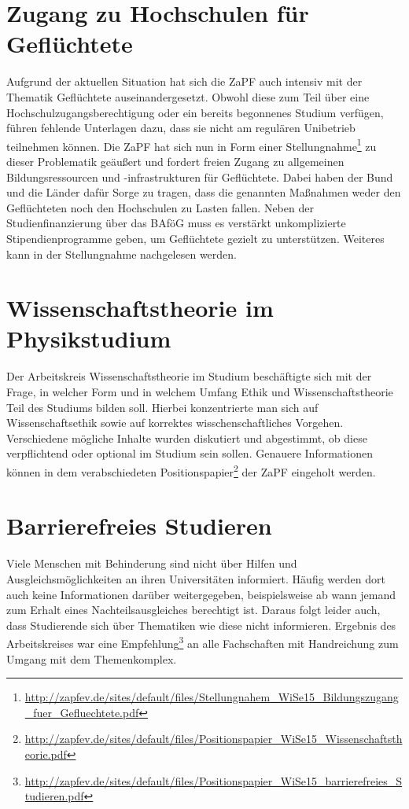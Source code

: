 \section*{Zugang zu Hochschulen für Geflüchtete}
Aufgrund der aktuellen Situation hat sich die ZaPF auch intensiv mit der
Thematik \glqq{}Geflüchtete\grqq{} auseinandergesetzt. Obwohl diese zum Teil
über eine Hochschulzugangsberechtigung oder ein bereits begonnenes Studium
verfügen, führen fehlende Unterlagen dazu, dass sie nicht am regulären
Unibetrieb teilnehmen können. Die ZaPF hat sich nun in Form einer
Stellungnahme\footnote{\href{http://zapfev.de/sites/default/files/Stellungnahem\_WiSe15\_Bildungszugang\_fuer\_Gefluechtete.pdf}{\url{http://zapfev.de/sites/default/files/Stellungnahem\_WiSe15\_Bildungszugang\_fuer\_Gefluechtete.pdf}}}
zu dieser Problematik geäußert und fordert freien Zugang zu allgemeinen
Bildungsressourcen und -infrastrukturen für Geflüchtete. Dabei haben der Bund
und die Länder dafür Sorge zu tragen, dass die genannten Maßnahmen weder den
Geflüchteten noch den Hochschulen zu Lasten fallen. Neben der
Studienfinanzierung über das BAföG muss es verstärkt unkomplizierte
Stipendienprogramme geben, um Geflüchtete gezielt zu unterstützen. Weiteres kann
in der Stellungnahme nachgelesen werden.

\section*{Wissenschaftstheorie im Physikstudium}
Der  Arbeitskreis \glqq{}Wissenschaftstheorie im Studium\grqq{} beschäftigte
sich mit der Frage, in welcher Form und in welchem Umfang Ethik und
Wissenschaftstheorie Teil des Studiums bilden soll. Hierbei konzentrierte man
sich auf Wissenschaftsethik sowie auf korrektes wisschenschaftliches Vorgehen.
Verschiedene mögliche Inhalte wurden diskutiert und abgestimmt, ob diese
verpflichtend oder optional im Studium sein sollen. Genauere Informationen
können in dem verabschiedeten
Positionspapier\footnote{\href{http://zapfev.de/sites/default/files/Positionspapier\_WiSe15\_Wissenschaftstheorie.pdf}{\url{http://zapfev.de/sites/default/files/Positionspapier\_WiSe15\_Wissenschaftstheorie.pdf}}}
der ZaPF eingeholt werden.

\section*{Barrierefreies Studieren}
Viele Menschen mit Behinderung sind nicht über Hilfen und
Ausgleichsmöglichkeiten an ihren Universitäten informiert. Häufig werden dort
auch keine Informationen darüber weitergegeben, beispielsweise ab wann jemand
zum Erhalt eines Nachteilsausgleiches berechtigt ist. Daraus folgt leider auch,
dass Studierende sich über Thematiken wie diese nicht informieren.  Ergebnis des
Arbeitskreises war eine
Empfehlung\footnote{\href{http://zapfev.de/sites/default/files/Positionspapier\_WiSe15\_barrierefreies\_Studieren.pdf}{\url{http://zapfev.de/sites/default/files/Positionspapier\_WiSe15\_barrierefreies\_Studieren.pdf}}}
an alle Fachschaften mit Handreichung zum Umgang mit dem Themenkomplex.

